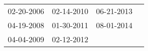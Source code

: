 \begin{supertabular}{llll}
 02-20-2006 &  02-14-2010 &  06-21-2013 \\
 04-19-2008 &  01-30-2011 &  08-01-2014 \\
 04-04-2009 &  02-12-2012 &             \\
\end{supertabular}
